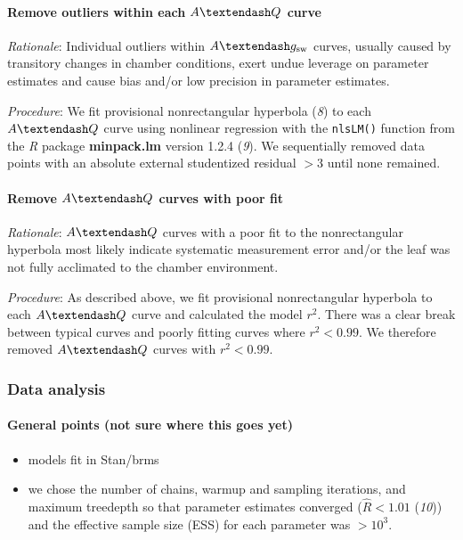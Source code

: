\documentclass[
  letterpaper,
  DIV=11,
  numbers=noendperiod]{scrartcl}
\let\oldparagraph\paragraph
\renewcommand{\paragraph}[1]{\oldparagraph{#1}\mbox{}}
\providecommand{\tightlist}{%
  \setlength{\itemsep}{0pt}\setlength{\parskip}{0pt}}\usepackage{longtable,booktabs,array}
\newcommand{\agcurve}{$A \textendash g_\text{sw}$}
\newcommand{\aqcurve}{$A \textendash Q$}
\begin{document}
\paragraph{\texorpdfstring{Remove outliers within each \aqcurve{}
curve}{Remove outliers within each  curve}}\label{remove-outliers-within-each-curve-1}

\emph{Rationale}: Individual outliers within \agcurve{} curves, usually
caused by transitory changes in chamber conditions, exert undue leverage
on parameter estimates and cause bias and/or low precision in parameter
estimates.

\emph{Procedure}: We fit provisional nonrectangular hyperbola (\emph{8})
to each \aqcurve{} curve using nonlinear regression with the
\texttt{nlsLM()} function from the \emph{R} package \textbf{minpack.lm}
version 1.2.4 (\emph{9}). We sequentially removed data points with an
absolute external studentized residual \(> 3\) until none remained.

\paragraph{\texorpdfstring{Remove \aqcurve{} curves with poor
fit}{Remove  curves with poor fit}}\label{remove-curves-with-poor-fit}

\emph{Rationale}: \aqcurve{} curves with a poor fit to the
nonrectangular hyperbola most likely indicate systematic measurement
error and/or the leaf was not fully acclimated to the chamber
environment.

\emph{Procedure}: As described above, we fit provisional nonrectangular
hyperbola to each \aqcurve{} curve and calculated the model \(r^2\).
There was a clear break between typical curves and poorly fitting curves
where \(r^2 < 0.99\). We therefore removed \aqcurve{} curves with
\(r^2 < 0.99\).

\subsubsection{Data analysis}\label{data-analysis}

\paragraph{General points (not sure where this goes
yet)}\label{general-points-not-sure-where-this-goes-yet}

\begin{itemize}
\tightlist
\item
  models fit in Stan/brms
\item
  we chose the number of chains, warmup and sampling iterations, and
  maximum treedepth so that parameter estimates converged
  (\(\hat{R} < 1.01\) (\emph{10})) and the effective sample size (ESS)
  for each parameter was \(> 10^3\).
\end{itemize}
\end{document}
